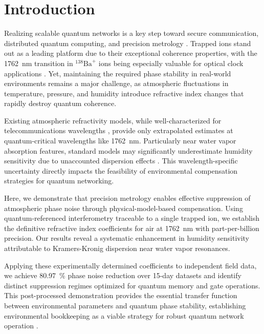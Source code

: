 \documentclass[aps,pra,reprint,groupedaddress,twocolumn,superscriptaddress]{revtex4-2}
\begin{document}

\maketitle

\section{Introduction}

Realizing scalable quantum networks is a key step toward secure communication, distributed quantum computing, and precision metrology \cite{kimble2008quantum,wehner2018quantum,azuma2023quantum}. Trapped ions stand out as a leading platform due to their exceptional coherence properties, with the \SI{1762}{\nano\meter} transition in $^{138}\text{Ba}^+$ ions being especially valuable for optical clock applications \cite{ludlow2015optical}. Yet, maintaining the required phase stability in real-world environments remains a major challenge, as atmospheric fluctuations in temperature, pressure, and humidity introduce refractive index changes that rapidly destroy quantum coherence.

Existing atmospheric refractivity models, while well-characterized for telecommunications wavelengths \cite{ciddor1996refractive, mathar2007refractive}, provide only extrapolated estimates at quantum-critical wavelengths like \SI{1762}{\nano\meter}. Particularly near water vapor absorption features, standard models may significantly underestimate humidity sensitivity due to unaccounted dispersion effects \cite{ptashnik2012water,kochanov2016hitran,gordon2022hitran2020}. This wavelength-specific uncertainty directly impacts the feasibility of environmental compensation strategies for quantum networking.

Here, we demonstrate that precision metrology enables effective suppression of atmospheric phase noise through physical-model-based compensation. Using quantum-referenced interferometry traceable to a single trapped ion, we establish the definitive refractive index coefficients for air at \SI{1762}{\nano\meter} with part-per-billion precision. Our results reveal a systematic enhancement in humidity sensitivity attributable to Kramers-Kronig dispersion near water vapor resonances.

Applying these experimentally determined coefficients to independent field data, we achieve \SI{80.97}{\percent} phase noise reduction over 15-day datasets and identify distinct suppression regimes optimized for quantum memory and gate operations. This post-processed demonstration provides the essential transfer function between environmental parameters and quantum phase stability, establishing environmental bookkeeping as a viable strategy for robust quantum network operation \cite{predehl2012920}.
\end{document}
